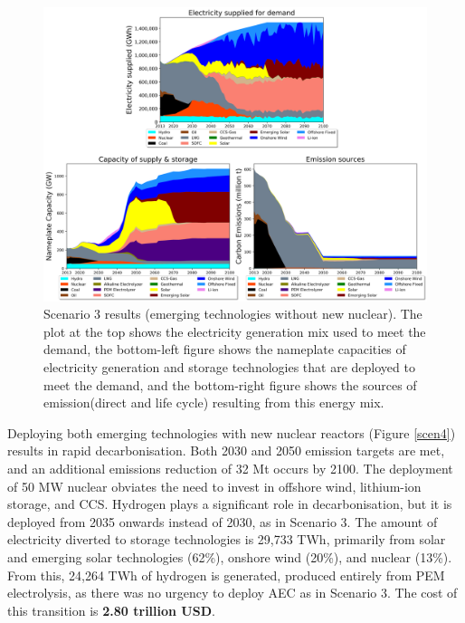 \begin{figure}[H] 
\centering
\includegraphics[scale=0.5]{figures/newtechs_nonuc}
\caption{Scenario 3 results (emerging technologies without new nuclear). The plot at the top shows the electricity generation mix used to meet the demand, the bottom-left figure shows the nameplate capacities of electricity generation and storage technologies that are deployed to meet the demand, and the bottom-right figure shows the sources of emission(direct and life cycle) resulting from this energy mix.}
\label{scen3}
\end{figure}

Deploying both emerging technologies with new nuclear reactors (Figure \ref{scen4}) results in rapid decarbonisation. Both 2030 and 2050 emission targets are met, and an additional emissions reduction of 32 Mt occurs by 2100. The deployment of 50 MW nuclear obviates the need to invest in offshore wind, lithium-ion storage, and \gls{CCS}. Hydrogen plays a significant role in decarbonisation, but it is deployed from 2035 onwards instead of 2030, as in Scenario 3. The amount of electricity diverted to storage technologies is 29,733 TWh, primarily from solar and emerging solar technologies (62\%), onshore wind (20\%), and nuclear (13\%). From this, 24,264 TWh of hydrogen is generated, produced entirely from PEM electrolysis, as there was no urgency to deploy \gls{AEC} as in Scenario 3. The cost of this transition is \textbf{2.80 trillion USD}.

